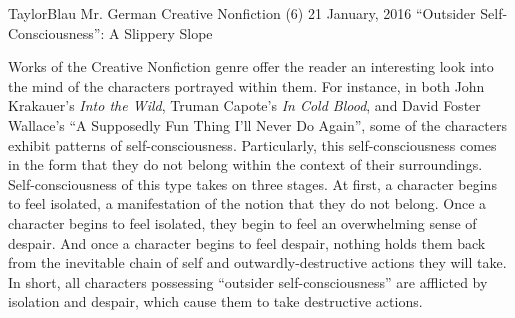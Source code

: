 \documentclass[12pt]{article}
\begin{document}
\begin{mla}
{Taylor}{Blau}
{Mr. German}
{Creative Nonfiction (6)}
{21 January, 2016}
{``Outsider Self-Consciousness'': A Slippery Slope}

Works of the Creative Nonfiction genre offer the reader an interesting look into
the mind of the characters portrayed within them. For instance, in both John
Krakauer's \textit{Into the Wild}, Truman Capote's \textit{In Cold Blood}, and
David Foster Wallace's ``A Supposedly Fun Thing I'll Never Do Again'', some of
the characters exhibit patterns of self-consciousness. Particularly, this
self-consciousness comes in the form that they do not belong within the context
of their surroundings. Self-consciousness of this type takes on three stages. At
first, a character begins to feel isolated, a manifestation of the notion that
they do not belong. Once a character begins to feel isolated, they begin to feel
an overwhelming sense of despair. And once a character begins to feel despair,
nothing holds them back from the inevitable chain of self and
outwardly-destructive actions they will take. In short, all characters
possessing ``outsider self-consciousness'' are afflicted by isolation and
despair, which cause them to take destructive actions.


\end{mla}
\end{document}
